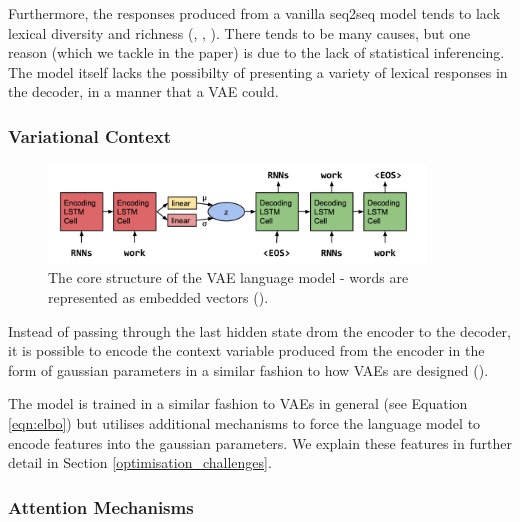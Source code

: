 \documentclass[12pt,twoside]{report}
\begin{document}
Furthermore, the responses produced from a vanilla seq2seq model tends to lack lexical diversity and richness (\cite{serban_hierarchical_2016}, \cite{zhao_learning_2017}, \cite{jiang_why_2018}). There tends to be many causes, but one reason (which we tackle in the paper) is due to the lack of statistical inferencing. The model itself lacks the possibilty of presenting a variety of lexical responses in the decoder, in a manner that a VAE could.

\subsubsection{Variational Context}

\begin{figure}[!ht]
	\centering
	\includegraphics[width=100mm]{diagrams/seq2seqvae.png}
	\caption{The core structure of the VAE language model - words are represented as embedded vectors (\cite{bowman_generating_2015}). \label{seq2seq_attn}}
\end{figure}

Instead of passing through the last hidden state drom the encoder to the decoder, it is possible to encode the context variable produced from the encoder in the form of gaussian parameters in a similar fashion to how VAEs are designed (\cite{bowman_generating_2015}).  

The model is trained in a similar fashion to VAEs in general (see Equation \ref{eqn:elbo}) but utilises additional mechanisms to force the language model to encode features into the gaussian parameters. We explain these features in further detail in Section \ref{optimisation_challenges}.

\subsubsection{Attention Mechanisms}
\end{document}
